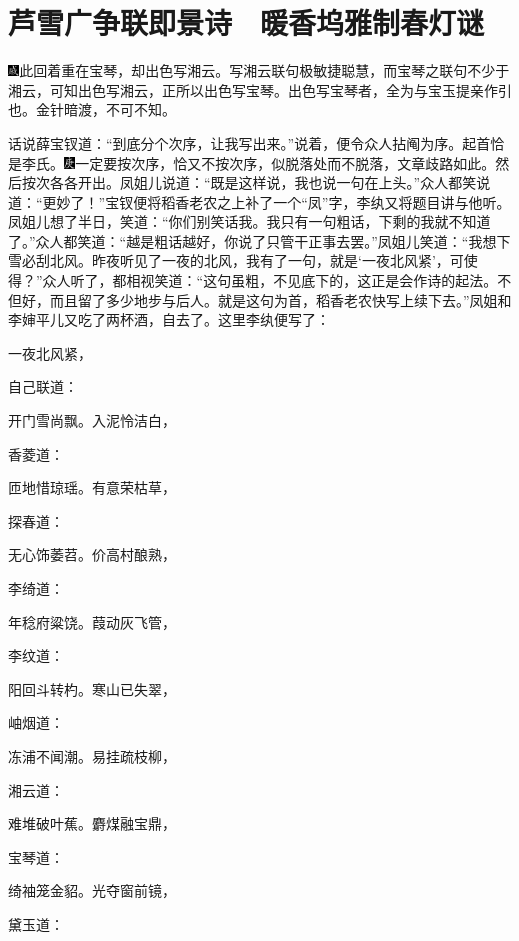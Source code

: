

\chapter{芦雪广争联即景诗　暖香坞雅制春灯谜}

{\includegraphics[width=3mm]{../Images/00005}此回着重在宝琴，却出色写湘云。写湘云联句极敏捷聪慧，而宝琴之联句不少于湘云，可知出色写湘云，正所以出色写宝琴。出色写宝琴者，全为与宝玉提亲作引也。金针暗渡，不可不知。}

话说薛宝钗道：``到底分个次序，让我写出来。''说着，便令众人拈阄为序。起首恰是李氏。{\includegraphics[width=3mm]{../Images/00004}一定要按次序，恰又不按次序，似脱落处而不脱落，文章歧路如此。}然后按次各各开出。凤姐儿说道：``既是这样说，我也说一句在上头。''众人都笑说道：``更妙了！''宝钗便将稻香老农之上补了一个``凤''字，李纨又将题目讲与他听。凤姐儿想了半日，笑道：``你们别笑话我。我只有一句粗话，下剩的我就不知道了。''众人都笑道：``越是粗话越好，你说了只管干正事去罢。''凤姐儿笑道：``我想下雪必刮北风。昨夜听见了一夜的北风，我有了一句，就是`一夜北风紧'，可使得？''众人听了，都相视笑道：``这句虽粗，不见底下的，这正是会作诗的起法。不但好，而且留了多少地步与后人。就是这句为首，稻香老农快写上续下去。''凤姐和李婶平儿又吃了两杯酒，自去了。这里李纨便写了：

一夜北风紧，

自己联道：

开门雪尚飘。入泥怜洁白，

香菱道：

匝地惜琼瑶。有意荣枯草，

探春道：

无心饰萎苕。价高村酿熟，

李绮道：

年稔府粱饶。葭动灰飞管，

李纹道：

阳回斗转杓。寒山已失翠，

岫烟道：

冻浦不闻潮。易挂疏枝柳，

湘云道：

难堆破叶蕉。麝煤融宝鼎，

宝琴道：

绮袖笼金貂。光夺窗前镜，

黛玉道：

